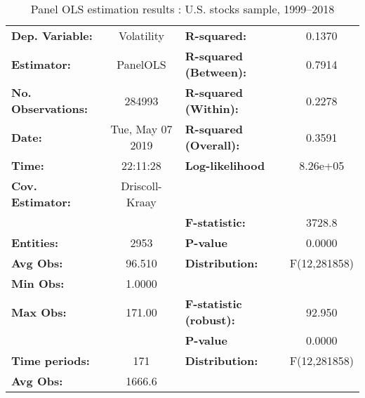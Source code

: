 {\linespread{1.0}
\begin{table}[htbp]
\caption{Panel OLS estimation results : U.S. stocks sample, 1999--2018}
\label{tab:VolatilityUS_4Lags}
\begin{center}
    \begin{tabular}{lclc}
      \toprule
      \textbf{Dep. Variable:}                 &     Volatility     & \textbf{  R-squared:         }   &      0.1370      \\
      \textbf{Estimator:}                     &      PanelOLS      & \textbf{  R-squared (Between):}  &      0.7914      \\
      \textbf{No. Observations:}              &       284993       & \textbf{  R-squared (Within):}   &      0.2278      \\
      \textbf{Date:}                          &  Tue, May 07 2019  & \textbf{  R-squared (Overall):}  &      0.3591      \\
      \textbf{Time:}                          &      22:11:28      & \textbf{  Log-likelihood     }   &     8.26e+05     \\
      \textbf{Cov. Estimator:}                &   Driscoll-Kraay   & \textbf{                     }   &                  \\
      \textbf{}                               &                    & \textbf{  F-statistic:       }   &      3728.8      \\
      \textbf{Entities:}                      &        2953        & \textbf{  P-value            }   &      0.0000      \\
      \textbf{Avg Obs:}                       &       96.510       & \textbf{  Distribution:      }   &   F(12,281858)   \\
      \textbf{Min Obs:}                       &       1.0000       & \textbf{                     }   &                  \\
      \textbf{Max Obs:}                       &       171.00       & \textbf{  F-statistic (robust):} &      92.950      \\
      \textbf{}                               &                    & \textbf{  P-value            }   &      0.0000      \\
      \textbf{Time periods:}                  &        171         & \textbf{  Distribution:      }   &   F(12,281858)   \\
      \textbf{Avg Obs:}                       &       1666.6       & \textbf{                     }   &                  \\

\end{tabular}
\end{center}
\end{table}}
